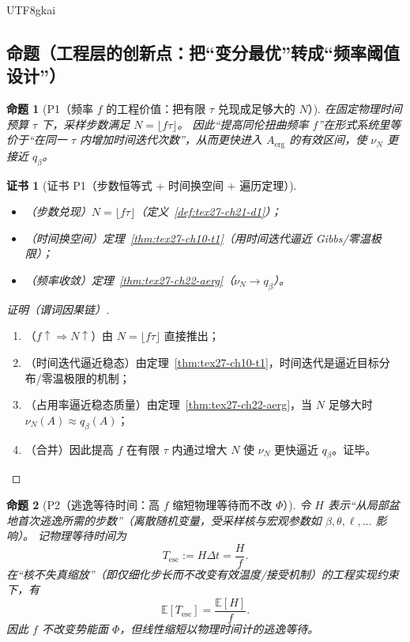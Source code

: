 \documentclass[12pt]{article}
\newtheorem{proposition}{命题}[section]
\newtheorem{Certificate}{证书}[section]
\begin{document}
\begin{CJK*}{UTF8}{gkai}
\subsection{命题（工程层的创新点：把“变分最优”转成“频率阈值设计”）}
\label{subsec:tex27-ch22-props}

\begin{proposition}[P1（频率 $f$ 的工程价值：把有限 $\tau$ 兑现成足够大的 $N$）]
\label{prop:tex27-ch22-p1}
在固定物理时间预算 $\tau$ 下，采样步数满足 $N=\lfloor f\tau\rfloor$。
因此“提高同伦扭曲频率 $f$”在形式系统里等价于“在同一 $\tau$ 内增加时间迭代次数”，从而更快进入
$A_{\mathrm{erg}}$ 的有效区间，使 $\nu_N$ 更接近 $q_\beta$。
\end{proposition}

\begin{Certificate}[证书 P1（步数恒等式 + 时间换空间 + 遍历定理）]
\label{cert:tex27-ch22-p1}
\begin{itemize}
  \item（步数兑现）$N=\lfloor f\tau\rfloor$（定义~\ref{def:tex27-ch21-d1}）；
  \item（时间换空间）定理~\ref{thm:tex27-ch10-t1}（用时间迭代逼近 Gibbs/零温极限）；
  \item（频率收敛）定理~\ref{thm:tex27-ch22-aerg}（$\nu_N\to q_\beta$）。
\end{itemize}
\end{Certificate}

\begin{proof}[证明（谓词因果链）]
\begin{enumerate}
  \item（$f\uparrow\Rightarrow N\uparrow$）由 $N=\lfloor f\tau\rfloor$ 直接推出；
  \item（时间迭代逼近稳态）由定理~\ref{thm:tex27-ch10-t1}，时间迭代是逼近目标分布/零温极限的机制；
  \item（占用率逼近稳态质量）由定理~\ref{thm:tex27-ch22-aerg}，当 $N$ 足够大时 $\nu_N(A)\approx q_\beta(A)$；
  \item（合并）因此提高 $f$ 在有限 $\tau$ 内通过增大 $N$ 使 $\nu_N$ 更快逼近 $q_\beta$。证毕。
\end{enumerate}
\end{proof}

\begin{proposition}[P2（逃逸等待时间：高 $f$ 缩短物理等待而不改 $\Phi$）]
\label{prop:tex27-ch22-p2}
令 $H$ 表示“从局部盆地首次逃逸所需的步数”（离散随机变量，受采样核与宏观参数如 $\beta,\theta,\ell,\dots$ 影响）。
记物理等待时间为
\[
  T_{\mathrm{esc}}:=H\Delta t=\frac{H}{f}.
\]
在“核不失真缩放”（即仅细化步长而不改变有效温度/接受机制）的工程实现约束下，有
\[
  \mathbb{E}[T_{\mathrm{esc}}]=\frac{\mathbb{E}[H]}{f}.
\]
因此 $f$ 不改变势能面 $\Phi$，但线性缩短以物理时间计的逃逸等待。
\end{proposition}


\end{CJK*}
\end{document}
